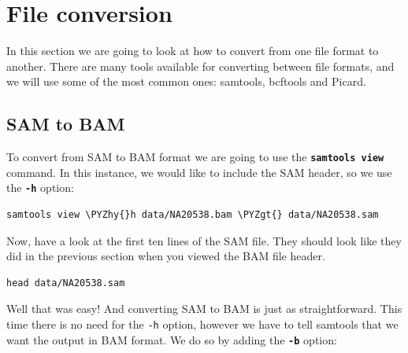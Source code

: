 \documentclass[11pt]{article}
\makeatletter
\def\PYZgt{\char`\>}
\def\PYZhy{\char`\-}
\newcommand{\boxspacing}{\kern\kvtcb@left@rule\kern\kvtcb@boxsep}
\newcommand{\prompt}[4]{
        {\ttfamily\llap{{\color{blue}\LARGE\faKeyboardO\hspace{3pt}#4}}\vspace{-\baselineskip}}
    }
\makeatother
\begin{document}



\newpage





    \hypertarget{file-conversion}{%
\section{File conversion}\label{file-conversion}}

In this section we are going to look at how to convert from one file
format to another. There are many tools available for converting between
file formats, and we will use some of the most common ones: samtools,
bcftools and Picard.

\hypertarget{sam-to-bam}{%
\subsection{SAM to BAM}\label{sam-to-bam}}

To convert from SAM to BAM format we are going to use the
\textbf{\texttt{samtools\ view}} command. In this instance, we would
like to include the SAM header, so we use the \textbf{\texttt{-h}}
option:

    \begin{tcolorbox}[breakable, size=fbox, boxrule=1pt, pad at break*=1mm,colback=cellbackground, colframe=cellborder]
\prompt{In}{incolor}{ }{\boxspacing}
\begin{Verbatim}[commandchars=\\\{\}]
samtools view \PYZhy{}h data/NA20538.bam \PYZgt{} data/NA20538.sam
\end{Verbatim}
\end{tcolorbox}

    Now, have a look at the first ten lines of the SAM file. They should
look like they did in the previous section when you viewed the BAM file
header.

    \begin{tcolorbox}[breakable, size=fbox, boxrule=1pt, pad at break*=1mm,colback=cellbackground, colframe=cellborder]
\prompt{In}{incolor}{ }{\boxspacing}
\begin{Verbatim}[commandchars=\\\{\}]
head data/NA20538.sam
\end{Verbatim}
\end{tcolorbox}

    Well that was easy! And converting SAM to BAM is just as
straightforward. This time there is no need for the \texttt{-h} option,
however we have to tell samtools that we want the output in BAM format.
We do so by adding the \textbf{\texttt{-b}} option:
\end{document}
